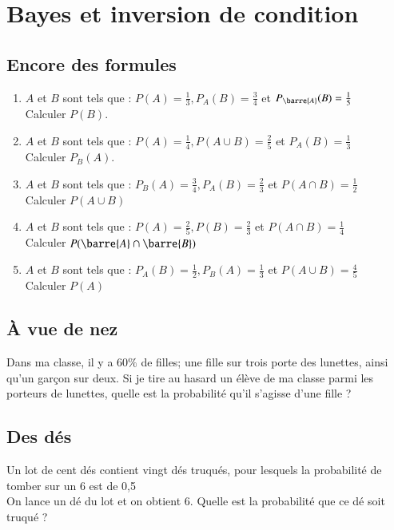 \documentclass[oneside,12pt]{article}          %
\begin{document}
\section{Bayes et inversion de condition}


\subsection{Encore des formules}
\begin{enumerate}
    \item $A$ et $B$ sont tels que : $P(A)=\frac{1}{3},P_{A}(B)=\frac{3}{4}$ et $P_{\barre{A}}(B)=\frac{1}{5}$ \\
    Calculer $P(B)$.
    \item $A$ et $B$ sont tels que : $P(A)=\frac{1}{4},P(A\cup B)=\frac{2}{5}$ et $P_{A}(B)=\frac{1}{3}$ \\
    Calculer $P_{B}(A)$.
    \item $A$ et $B$ sont tels que : $P_B(A)=\frac{3}{4},P_A(B)=\frac{2}{3}$ et $P(A\cap B)=\frac{1}{2}$ \\
    Calculer $P(A\cup B)$
    \item $A$ et $B$ sont tels que : $P(A)=\frac{2}{5},P(B)=\frac{2}{3}$ et $P(A\cap B)=\frac{1}{4}$\\				Calculer $P(\barre{A}\cap\barre{B})$
    \item $A$ et $B$ sont tels que : $P_A(B)=\frac{1}{2} , P_B(A)=\frac{1}{3}$ et $P(A\cup B)=\frac{4}{5}$\\
    Calculer $P(A)$
\end{enumerate}



\subsection{À vue de nez}
 Dans ma classe, il y a 60$\%$ de filles; une fille sur trois porte des lunettes, ainsi qu'un garçon sur deux. Si je tire au hasard un élève de ma classe parmi les porteurs de lunettes, quelle est la probabilité qu'il s'agisse d'une fille ?



\subsection{Des dés}
 Un lot de cent dés contient vingt dés truqués, pour lesquels la probabilité de tomber sur un 6 est de 0,5 \\
On lance un dé du lot et on obtient 6. Quelle est la probabilité que ce dé soit truqué ?
\end{document}
